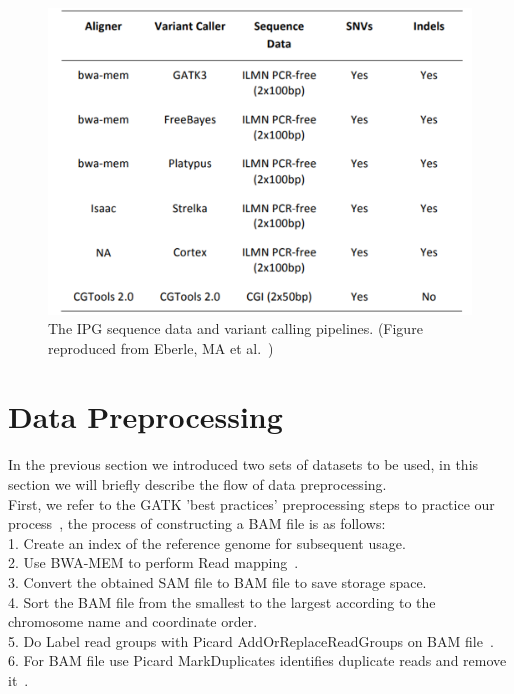 \documentclass[PhD]{PHlab-thesis}
\begin{document}
\begin{figure}[h!]
	\centering
	\includegraphics[scale=0.4]{figures/IPG_VariantCaller.png}
	\caption{The IPG sequence data and variant calling pipelines. (Figure reproduced from Eberle, MA et al.~\cite{Eberle2021IPG})}
	\label{fig:IPG VariantCaller} %
\end{figure}

\section{Data Preprocessing}
In the previous section we introduced two sets of datasets to be used, in this section we will briefly describe the flow of data preprocessing.\\
First, we refer to the GATK 'best practices' preprocessing steps to practice our process~\cite{Geraldine2013GATKBestP}, the process of constructing a BAM file is as follows:\\
1. Create an index of the reference genome for subsequent usage.\\
2. Use BWA-MEM to perform Read mapping~\cite{Li2013BWA}.\\3. Convert the obtained SAM file to BAM file to save storage space.\\
4. Sort the BAM file from the smallest to the largest according to the chromosome name and coordinate order.\\
5. Do Label read groups with Picard AddOrReplaceReadGroups on BAM file~\cite{AddOrReplaceReadGroups}.\\
6. For BAM file use Picard MarkDuplicates identifies duplicate reads and remove it~\cite{MarkDuplicates}.
\end{document}
